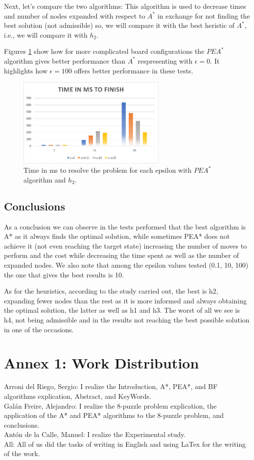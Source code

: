 \documentclass[runningheads]{llncs}
\begin{document}
Next, let's compare the two algorithms:
This algorithm is used to decrease times and number of nodes expanded
with respect to $A^*$ in exchange for not finding the best solution (not admissible) so, we will compare it with the best heristic of $A^*$, i.e., we will compare it with $h_2$.

Figures \ref{fig4} show how for more complicated board configurations the $PEA^*$ algorithm gives better performance than $A^*$ respresenting with $\epsilon=0$.
It highlights how $\epsilon=100$ offers better performance in these tests.

\begin{figure}
    \centering
    \includegraphics[width=0.65\textwidth]{time_AvsPEA.png}
    \caption{Time in ms to resolve the problem for each epsilon with $PEA^*$ algorithm and $h_2$.} \label{fig4}
\end{figure}

\section{Conclusions}
As a conclusion we can observe in the tests performed that the best 
algorithm is A* as it always finds the optimal solution, while sometimes 
PEA* does not achieve it (not even reaching the target state) increasing 
the number of moves to perform and the cost while decreasing the time spent 
as well as the number of expanded nodes. We also note that among the epsilon 
values tested (0.1, 10, 100) the one that gives the best results is 10.

As for the heuristics, according to the study carried out, the best is h2, 
expanding fewer nodes than the rest as it is more informed and always obtaining 
the optimal solution, the latter as well as h1 and h3. The worst of all we 
see is h4, not being admissible and in the results not reaching the best possible 
solution in one of the occasions.

 
 
\appendix
\chapter*{Annex 1: Work Distribution}
Arroni del Riego, Sergio: I realize the Introduction, A*, PEA*, and BF algorithms explication, Abstract, and KeyWords.\\
Galán Freire, Alejandro: I realize the 8-puzzle problem explication, the application of the A* and PEA* algorithms to the 8-puzzle problem, and conclusions.\\
Antón de la Calle, Manuel: I realize the Experimental study.\\
All: All of us did the tasks of writing in English and using LaTex for the writing of the work.
\end{document}
